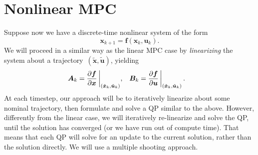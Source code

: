 \documentclass{article}
\begin{document}
\section{Nonlinear MPC}

Suppose now we have a discrete-time nonlinear system of the form
\begin{equation}\label{eq:nonlinear}
  \bm{x}_{k+1} = \bm{f}(\bm{x}_k,\bm{u}_k).
\end{equation}
We will proceed in a similar way as the linear MPC case by \emph{linearizing}
the system about a trajectory~$(\tilde{\bm{x}},\tilde{\bm{u}})$, yielding
\begin{align*}
  \bm{A}_k &= \frac{\partial \bm{f}}{\partial \bm{x}}\operatorname{\biggr\rvert}_{(\tilde{\bm{x}}_k,\tilde{\bm{u}}_k)}, &
  \bm{B}_k &= \frac{\partial \bm{f}}{\partial \bm{u}}\operatorname{\biggr\rvert}_{(\tilde{\bm{x}}_k,\tilde{\bm{u}}_k)}.
\end{align*}
At each timestep, our approach will be to iteratively linearize about some
nominal trajectory, then formulate and solve a QP similar to the above.
However, differently from the linear case, we will iteratively re-linearize and
solve the QP, until the solution has converged (or we have run out of compute
time). That means that each QP will solve for an update to the current
solution, rather than the solution directly. We will use a multiple shooting
approach.
\end{document}
